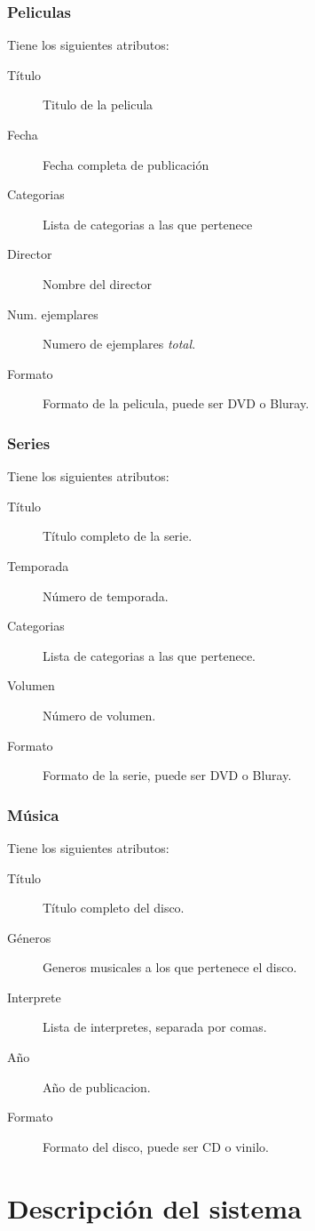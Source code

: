 \documentclass[11pt]{article}
\begin{document}
\subsubsection{Peliculas}
Tiene los siguientes atributos:
\begin{description}
	\item[Título] Titulo de la pelicula
	\item[Fecha] Fecha completa de publicación 
	\item[Categorias] Lista de categorias a las que pertenece
	\item[Director] Nombre del director
	\item[Num. ejemplares] Numero de ejemplares \emph{total}.
	\item[Formato] Formato de la pelicula, puede ser DVD o Bluray.
\end{description}

\subsubsection{Series}
Tiene los siguientes atributos:
\begin{description}
	\item[Título] Título completo de la serie.
	\item[Temporada] Número de temporada.
	\item[Categorias] Lista de categorias a las que pertenece.
	\item[Volumen] Número de volumen. 
	\item[Formato] Formato de la serie, puede ser DVD o Bluray.
\end{description}


\subsubsection{Música}
Tiene los siguientes atributos:
\begin{description}
	\item[Título] Título completo del disco.
	\item[Géneros] Generos musicales a los que pertenece el disco.
	\item[Interprete] Lista de interpretes, separada por comas.
	\item[Año] Año de publicacion.
	\item[Formato] Formato del disco, puede ser CD o vinilo.
\end{description}

\section{Descripción del sistema}
\end{document}
